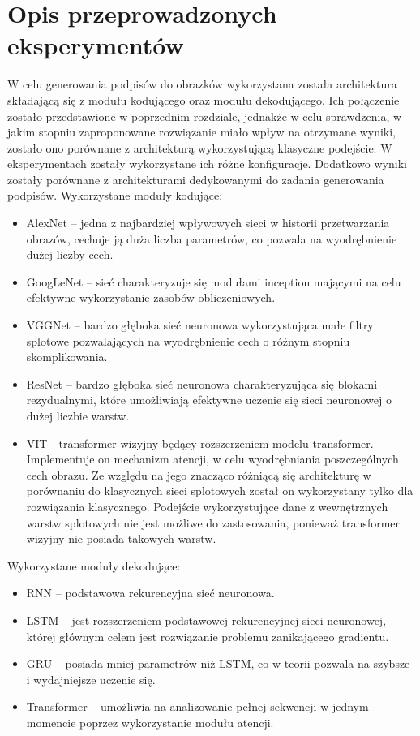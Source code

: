 \newpage %

\section{Opis przeprowadzonych eksperymentów}
W celu generowania podpisów do obrazków wykorzystana została architektura składającą się z modułu kodującego oraz modułu dekodującego. Ich połączenie zostało przedstawione w poprzednim rozdziale, jednakże w celu sprawdzenia, w jakim stopniu zaproponowane rozwiązanie miało wpływ na otrzymane wyniki, zostało ono porównane z architekturą wykorzystującą klasyczne podejście. W eksperymentach zostały wykorzystane ich różne konfiguracje. Dodatkowo wyniki zostały porównane z architekturami dedykowanymi do zadania generowania podpisów. Wykorzystane moduły kodujące:
\begin{itemize}
    \item AlexNet \cite{alexnet} -- jedna z najbardziej wpływowych sieci w historii przetwarzania obrazów, cechuje ją duża liczba parametrów, co pozwala na wyodrębnienie dużej liczby cech.
    \item GoogLeNet \cite{googlenet} -- sieć charakteryzuje się modułami inception mającymi na celu efektywne wykorzystanie zasobów obliczeniowych.
    \item VGGNet \cite{vggnet} -- bardzo głęboka sieć neuronowa wykorzystująca małe filtry splotowe pozwalających na wyodrębnienie cech o różnym stopniu skomplikowania.
    \item ResNet \cite{resnet} -- bardzo głęboka sieć neuronowa charakteryzująca się blokami rezydualnymi, które umożliwiają efektywne uczenie się sieci neuronowej o dużej liczbie warstw.
    \item VIT \cite{vit} - transformer wizyjny będący rozszerzeniem modelu transformer. Implementuje on mechanizm atencji, w celu wyodrębniania poszczególnych cech obrazu. Ze względu na jego znacząco różniącą się architekturę w porównaniu do klasycznych sieci splotowych został on wykorzystany tylko dla rozwiązania klasycznego. Podejście wykorzystujące dane z wewnętrznych warstw splotowych nie jest możliwe do zastosowania, ponieważ transformer wizyjny nie posiada takowych warstw.
\end{itemize}
Wykorzystane moduły dekodujące:
\begin{itemize}
    \item RNN \cite{rnn} -- podstawowa rekurencyjna sieć neuronowa.
    \item LSTM \cite{lstm} -- jest rozszerzeniem podstawowej rekurencyjnej sieci neuronowej, której głównym celem jest rozwiązanie problemu zanikającego gradientu.
    \item GRU \cite{gru} -- posiada mniej parametrów niż LSTM, co w teorii pozwala na szybsze i wydajniejsze uczenie się.
    \item Transformer \cite{transformer} -- umożliwia na analizowanie pełnej sekwencji w jednym momencie poprzez wykorzystanie modułu atencji.
\end{itemize}
